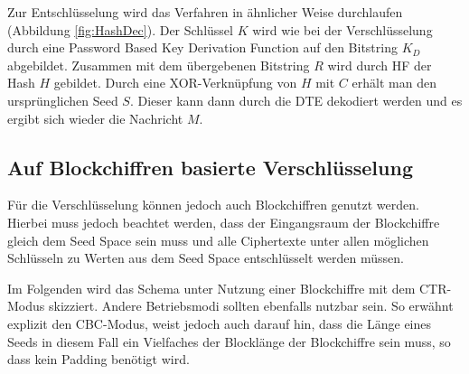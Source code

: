 Zur Entschlüsselung wird das Verfahren in ähnlicher Weise durchlaufen (Abbildung \ref{fig:HashDec}). Der Schlüssel \(K\) wird wie bei der Verschlüsselung durch eine Password Based Key Derivation Function auf den Bitstring \(K_D\) abgebildet. Zusammen mit dem übergebenen Bitstring \(R\) wird durch HF der Hash \(H\) gebildet. Durch eine XOR-Verknüpfung von \(H\) mit \(C\) erhält man den ursprünglichen Seed \(S\). Dieser kann dann durch die DTE  dekodiert werden und es ergibt sich wieder die Nachricht \(M\).

\subsection{Auf Blockchiffren basierte Verschlüsselung}

Für die Verschlüsselung können jedoch auch Blockchiffren genutzt werden. Hierbei muss jedoch beachtet werden, dass der Eingangsraum der Blockchiffre gleich dem Seed Space sein muss und alle Ciphertexte unter allen möglichen Schlüsseln zu Werten aus dem Seed Space entschlüsselt werden müssen.

Im Folgenden wird das Schema unter Nutzung einer Blockchiffre mit dem CTR-Modus skizziert. Andere Betriebsmodi sollten ebenfalls nutzbar sein. So erwähnt \cite{EURO2014} explizit den CBC-Modus, weist jedoch auch darauf hin, dass die Länge eines Seeds in diesem Fall ein Vielfaches der Blocklänge der Blockchiffre sein muss, so dass kein Padding benötigt wird. 

